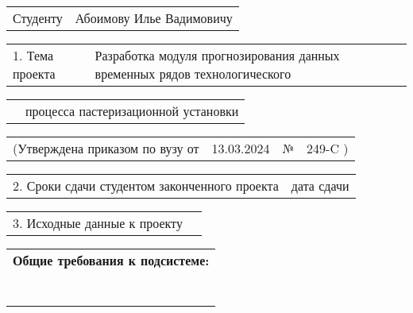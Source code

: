 \documentclass[12pt, А4, twoside]{article} %
\begin{document}
\begin{FlushLeft} 
\fontsize{12}{15} %

    \begin{tabular}{p{1.9cm} p{14.95cm}}
        \textsf{Студенту} & 
        \textsf{Абоимову Илье Вадимовичу} \vspace{1pt} \hline 
    \end{tabular} 

    \begin{tabular}{p{2.8cm} p{14.05cm}}
        \textsf{1. Тема проекта} & 
        \textsf{Разработка модуля прогнозирования данных временных рядов технологического} \vspace{1pt} \hline  
    \end{tabular} 

    \begin{tabular}{p{2.8cm} p{14.05cm}} 
        & \textsf{процесса пастеризационной установки} \vspace{1pt} \hline 
    \end{tabular} 

    \begin{tabular}{p{5.9cm} p{4.8cm} p{0.3cm} p{5.0cm}} 
        \textsf{(Утверждена приказом по вузу от} &
        \centering \textsf{13.03.2024} \vspace{2pt} \hline &
        \centering \textsf{№} &
        \centering \textsf{249-C \hspace{0.5cm} )} \hline
    \end{tabular} 

    \begin{tabular}{p{9.4cm} p{7.45cm}} 
        \textsf{2. Сроки сдачи студентом законченного проекта} &
        \centering \textsf{дата сдачи} \vspace{1pt} \hline
    \end{tabular} 

    \begin{tabular}{p{5.7cm} p{11.15cm}} 
        \textsf{3. Исходные данные к проекту} &
        \vspace{1pt} \hline
    \end{tabular}   

    \begin{tabular}{p{17.25cm}}  
        \textsf{\textbf{Общие требования к подсистеме:}} \vspace{1pt} \hline \\
        \vspace{1pt} \hline \\
        \vspace{1pt} \hline \\
        \vspace{1pt} \hline \\
        \vspace{1pt} \hline \\
        \vspace{1pt} \hline \\
        \vspace{1pt} \hline \\
        \vspace{1pt} \hline
    \end{tabular}   


\end{FlushLeft}
\end{document}

